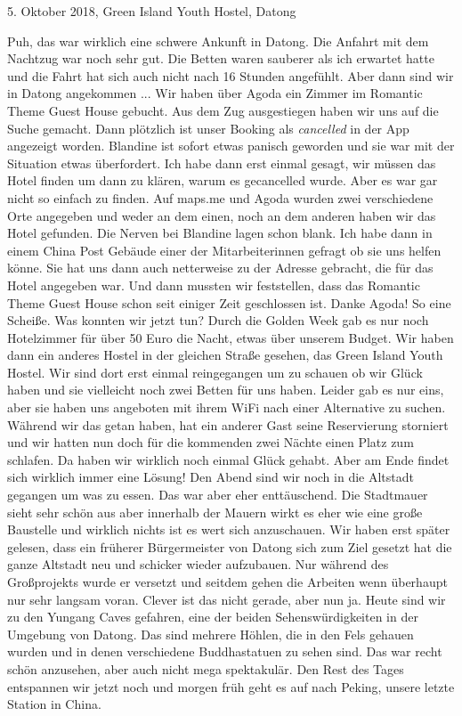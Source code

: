 \documentclass[11pt]{book}
\begin{document}
5. Oktober 2018, Green Island Youth Hostel, Datong

Puh, das war wirklich eine schwere Ankunft in Datong. Die Anfahrt mit dem Nachtzug war noch sehr gut. Die Betten 
waren sauberer als ich erwartet hatte und die Fahrt hat sich auch nicht nach 16 Stunden angefühlt. Aber dann sind 
wir in Datong angekommen ...
Wir haben über Agoda ein Zimmer im Romantic Theme Guest House gebucht. Aus dem Zug ausgestiegen haben wir uns auf die
Suche gemacht. Dann plötzlich ist unser Booking als \emph{cancelled} in der App angezeigt worden. Blandine ist 
sofort etwas panisch geworden und sie war mit der Situation etwas überfordert. Ich habe dann erst einmal gesagt, 
wir müssen das Hotel finden um dann zu klären, warum es gecancelled wurde. Aber es war gar nicht so einfach zu 
finden. Auf maps.me und Agoda wurden zwei verschiedene Orte angegeben und weder an dem einen, noch an dem anderen 
haben wir das Hotel gefunden. Die Nerven bei Blandine lagen schon blank. Ich habe dann in einem China Post Gebäude 
einer der Mitarbeiterinnen gefragt ob sie uns helfen könne. Sie hat uns dann auch netterweise zu der Adresse gebracht, 
die für das Hotel angegeben war. Und dann mussten wir feststellen, dass das Romantic Theme Guest House schon seit
einiger Zeit geschlossen ist. Danke Agoda! So eine Scheiße. Was konnten wir jetzt tun? Durch die Golden Week gab 
es nur noch Hotelzimmer für über 50 Euro die Nacht, etwas über unserem Budget. Wir haben dann ein anderes Hostel
in der gleichen Straße gesehen, das Green Island Youth Hostel. Wir sind dort erst einmal reingegangen um zu schauen 
ob wir Glück haben und sie vielleicht noch zwei Betten für uns haben. Leider gab es nur eins, aber sie haben uns 
angeboten mit ihrem WiFi nach einer Alternative zu suchen. Während wir das getan haben, hat ein anderer Gast seine 
Reservierung storniert und wir hatten nun doch für die kommenden zwei Nächte einen Platz zum schlafen. Da haben 
wir wirklich noch einmal Glück gehabt. Aber am Ende findet sich wirklich immer eine Lösung!
Den Abend sind wir noch in die Altstadt gegangen um was zu essen. Das war aber eher enttäuschend. Die Stadtmauer 
sieht sehr schön aus aber innerhalb der Mauern wirkt es eher wie eine große Baustelle und wirklich nichts ist es 
wert sich anzuschauen. Wir haben erst später gelesen, dass ein früherer Bürgermeister von Datong sich zum Ziel 
gesetzt hat die ganze Altstadt neu und schicker wieder aufzubauen. Nur während des Großprojekts wurde er versetzt 
und seitdem gehen die Arbeiten wenn überhaupt nur sehr langsam voran. Clever ist das nicht gerade, aber nun ja.
Heute sind wir zu den Yungang Caves gefahren, eine der beiden Sehenswürdigkeiten in der Umgebung von Datong. Das 
sind mehrere Höhlen, die in den Fels gehauen wurden und in denen verschiedene Buddhastatuen zu sehen sind. Das war
recht schön anzusehen, aber auch nicht mega spektakulär. Den Rest des Tages entspannen wir jetzt noch und morgen früh 
geht es auf nach Peking, unsere letzte Station in China.
\end{document}
